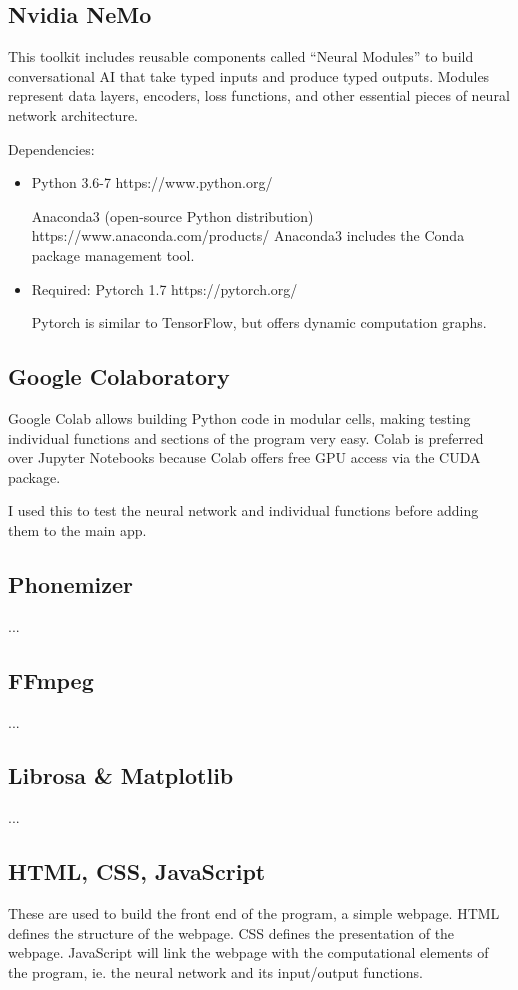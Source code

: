 \documentclass[12pt, letterpaper]{article}
\begin{document}
\subsection*{Nvidia NeMo}
This toolkit includes reusable components called “Neural Modules” to build conversational AI that take typed inputs and produce typed outputs. Modules represent data layers, encoders, loss functions, and other essential pieces of neural network architecture.

Dependencies:
\begin{itemize}
\item Python 3.6-7 https://www.python.org/

Anaconda3 (open-source Python distribution) https://www.anaconda.com/products/ 
Anaconda3 includes the Conda package management tool.

\item Required: Pytorch 1.7 https://pytorch.org/

Pytorch is similar to TensorFlow, but offers dynamic computation graphs.
\end{itemize}

\subsection*{Google Colaboratory}
Google Colab allows building Python code in modular cells, making testing individual functions and sections of the program very easy. Colab is preferred over Jupyter Notebooks because Colab offers free GPU access via the CUDA package.

I used this to test the neural network and individual functions before adding them to the main app. 

\subsection*{Phonemizer}
...

\subsection*{FFmpeg}
...

\subsection*{Librosa \& Matplotlib}
...

\subsection*{HTML, CSS, JavaScript}
These are used to build the front end of the program, a simple webpage.
HTML defines the structure of the webpage.
CSS defines the presentation of the webpage.
JavaScript will link the webpage with the computational elements of the program, ie. the neural network and its input/output functions.
\end{document}
